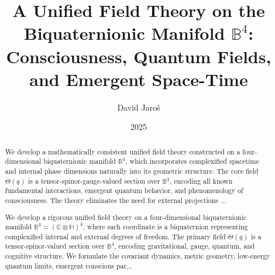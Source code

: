 \documentclass[12pt]{article}
\title{A Unified Field Theory on the Biquaternionic Manifold \( \mathbb{B}^4 \): Consciousness, Quantum Fields, and Emergent Space-Time}
\author{David Jaroš}
\date{2025}
\begin{document}
\maketitle

\begin{abstract}
We develop a mathematically consistent unified field theory constructed on a four-dimensional biquaternionic manifold \( \mathbb{B}^4 \), which incorporates complexified spacetime and internal phase dimensions naturally into its geometric structure. The core field \( \Theta(q) \) is a tensor-spinor-gauge-valued section over \( \mathbb{B}^4 \), encoding all known fundamental interactions, emergent quantum behavior, and phenomenology of consciousness. The theory eliminates the need for external projections ...

We develop a rigorous unified field theory on a four-dimensional biquaternionic manifold \( \mathbb{B}^4 = (\mathbb{C} \otimes \mathbb{H})^4 \), where each coordinate is a biquaternion representing complexified internal and external degrees of freedom. The primary field \( \Theta(q) \) is a tensor-spinor-valued section over \( \mathbb{B}^4 \), encoding gravitational, gauge, quantum, and cognitive structure. We formulate the covariant dynamics, metric geometry, low-energy quantum limits, emergent conscious par...
\end{abstract}

\vspace{1em}
\noindent{}
\vspace{1em}
\end{document}
